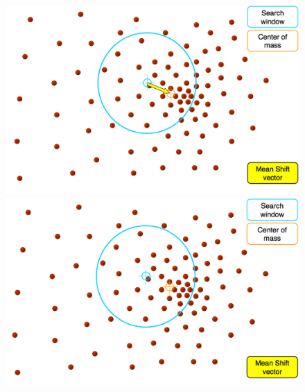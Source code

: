 \documentclass[notheorems,serif,table,compress]{beamer}  %
\begin{document}
\begin{frame}
\begin{figure}
\begin{minipage}[t]{0.45\linewidth}
      \includegraphics[width=1\linewidth]{meanshift3.png} 
      \end{minipage}
      \pause
      \begin{minipage}[t]{0.45\linewidth}
      \includegraphics[width=1\linewidth]{meanshift4.png} 
      \end{minipage}
    \end{figure}
\end{frame}
\end{document}
